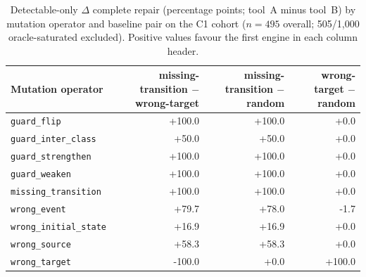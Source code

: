 \begin{table}[t]
\caption{Detectable-only $\Delta$ complete repair (percentage points; tool~A minus tool~B) by mutation operator and baseline pair on the C1 cohort ($n=495$ overall; 505/1{,}000 oracle-saturated excluded). Positive values favour the first engine in each column header.}
\label{tab:baseline-delta-by-operator}
\begin{tabular}{@{}lrrr@{}}
\toprule
Mutation operator & missing-transition $-$ wrong-target & missing-transition $-$ random & wrong-target $-$ random \\
\midrule
\texttt{guard\_flip} & +100.0 & +100.0 & +0.0 \\
\texttt{guard\_inter\_class} & +50.0 & +50.0 & +0.0 \\
\texttt{guard\_strengthen} & +100.0 & +100.0 & +0.0 \\
\texttt{guard\_weaken} & +100.0 & +100.0 & +0.0 \\
\texttt{missing\_transition} & +100.0 & +100.0 & +0.0 \\
\texttt{wrong\_event} & +79.7 & +78.0 & -1.7 \\
\texttt{wrong\_initial\_state} & +16.9 & +16.9 & +0.0 \\
\texttt{wrong\_source} & +58.3 & +58.3 & +0.0 \\
\texttt{wrong\_target} & -100.0 & +0.0 & +100.0 \\
\bottomrule
\end{tabular}
\end{table}
